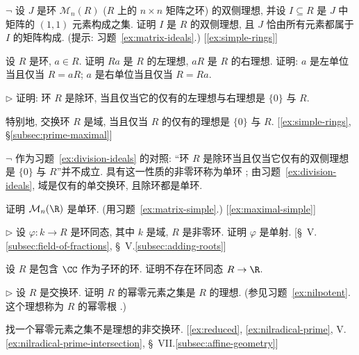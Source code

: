 \begin{prob}
\label{ex:matrix-simple}
$\neg$ 设 $J$ 是环 $\mathcal{M}_n(R)$ ($R$ 上的 $n \times n$ 矩阵之环) 的双侧理想, 并设 $I \subseteq R$ 是 $J$ 中矩阵的 $(1,1)$ 元素构成之集. 证明 $I$ 是 $R$ 的双侧理想, 且 $J$ 恰由所有元素都属于 $I$ 的矩阵构成. (提示: 习题~\ref{ex:matrix-ideals}.) [\ref{ex:simple-rings}]
\end{prob}

\begin{prob}
\label{ex:Ra-ideals}
设 $R$ 是环, $a \in R$. 证明 $Ra$ 是 $R$ 的左理想, $aR$ 是 $R$ 的右理想. 证明: $a$ 是左单位当且仅当 $R = aR$; $a$ 是右单位当且仅当 $R = Ra$.
\end{prob}

\begin{prob}
\label{ex:division-ideals}
$\triangleright$ 证明: 环 $R$ 是除环, 当且仅当它的仅有的左理想与右理想是 $\{0\}$ 与 $R$.

特别地, 交换环 $R$ 是域, 当且仅当 $R$ 的仅有的理想是 $\{0\}$ 与 $R$. [\ref{ex:simple-rings}, \S\ref{subsec:prime-maximal}]
\end{prob}

\begin{prob}
\label{ex:simple-rings}
$\neg$ 作为习题~\ref{ex:division-ideals} 的对照: ``环 $R$ 是除环当且仅当它仅有的双侧理想是 $\{0\}$ 与 $R$''并不成立. 具有这一性质的非零环称为单环%
; 由习题~\ref{ex:division-ideals}, 域是仅有的单交换环, 且除环都是单环. 

证明 $\mathcal{M}_n(\R)$ 是单环. (用习题~\ref{ex:matrix-simple}.) [\ref{ex:maximal-simple}]
\end{prob}

\begin{prob}
\label{ex:field-to-ring}
$\triangleright$ 设 $\varphi : k \to R$ 是环同态, 其中 $k$ 是域, $R$ 是非零环. 证明 $\varphi$ 是单射. [\S~V.\ref{subsec:field-of-fractions}, \S~V.\ref{subsec:adding-roots}]
\end{prob}

\begin{prob}
\label{ex:no-hom-C-R}
设 $R$ 是包含 $\CC$ 作为子环的环. 证明不存在环同态 $R \to \R$.
\end{prob}

\begin{prob}
\label{ex:nilradical}
$\triangleright$ 设 $R$ 是交换环. 证明 $R$ 的幂零元素之集是 $R$ 的理想. (参见习题~\ref{ex:nilpotent}. 这个理想称为 $R$ 的幂零根%
.)

找一个幂零元素之集不是理想的非交换环. [\ref{ex:reduced}, \ref{ex:nilradical-prime}, V.\ref{ex:nilradical-prime-intersection}, \S~VII.\ref{subsec:affine-geometry}]
\end{prob}

